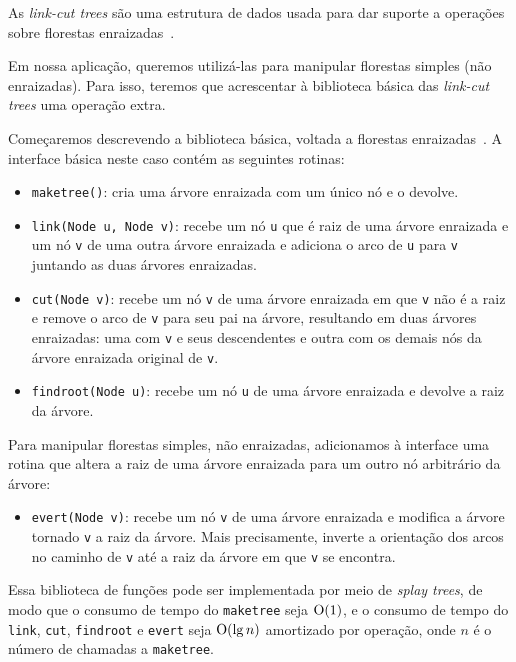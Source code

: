 As \emph{link-cut trees} são uma estrutura de dados usada para dar suporte a operações sobre florestas enraizadas~\cite{DemaineHJSI2012}.  

Em nossa aplicação, queremos utilizá-las para manipular florestas simples (não enraizadas). Para isso, teremos que acrescentar à biblioteca
básica das \emph{link-cut trees} uma operação extra.  

Começaremos descrevendo a biblioteca básica, voltada a florestas enraizadas~\cite{RamchandraCODEFORCE}. A interface básica neste caso contém as seguintes rotinas:  

\begin{itemize}
    \item \texttt{maketree()}: cria uma árvore enraizada com um único nó e o devolve.  

    \item \texttt{link(Node u, Node v)}: recebe um nó \texttt{u} que é raiz de uma árvore enraizada e um nó \texttt{v} de uma outra árvore enraizada e adiciona o arco de \texttt{u} para \texttt{v} juntando as duas árvores enraizadas.

    \item \texttt{cut(Node v)}: recebe um nó \texttt{v} de uma árvore enraizada em que \texttt{v} não é a raiz e remove o arco de \texttt{v} para seu pai na árvore, resultando em duas árvores enraizadas: uma com \texttt{v} e seus descendentes e outra com os demais nós da árvore enraizada original de \texttt{v}.

    \item \texttt{findroot(Node u)}: recebe um nó \texttt{u} de uma árvore enraizada e devolve a raiz da árvore.
\end{itemize}

Para manipular florestas simples, não enraizadas, adicionamos à interface uma rotina que altera a raiz de uma árvore enraizada para um outro nó arbitrário da árvore:  

\begin{itemize}
    \item \texttt{evert(Node v)}: recebe um nó \texttt{v} de uma árvore enraizada e modifica a árvore tornado \texttt{v} a raiz da árvore. Mais precisamente, inverte a orientação dos arcos no caminho de \texttt{v} até a raiz da árvore em que \texttt{v} se encontra.
\end{itemize}

Essa biblioteca de funções pode ser implementada por meio de \emph{splay trees}, de modo que o consumo de tempo do \texttt{maketree} seja $\mathrm{O}(1)$, e o consumo de tempo do \texttt{link}, \texttt{cut}, \texttt{findroot} e \texttt{evert} seja $\mathrm{O}(\lg n)$ amortizado por operação, onde $n$ é o número de chamadas a \texttt{maketree}.  

